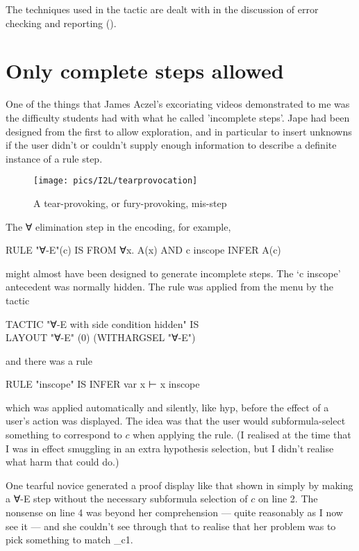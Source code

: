 The techniques used in the tactic are dealt with in the discussion of error checking and reporting ().

\section{Only complete steps allowed}

One of the things that James Aczel's excoriating videos demonstrated to me was the difficulty students had with what he called 'incomplete steps'. Jape had been designed from the first to allow exploration, and in particular to insert unknowns if the user didn't or couldn't supply enough information to describe a definite instance of a rule step. 

\begin{figure}
\centering
\texttt{[image: pics/I2L/tearprovocation]}
\caption{A tear-provoking, or fury-provoking, mis-step}
\label{fig:I2L:tearprovocation}
\end{figure}

The ∀ elimination step in the   encoding, for example,
\begin{japeish}
RULE "∀-E"(c) IS FROM ∀x. A(x) AND c inscope INFER A(c)
\end{japeish}
might almost have been designed to generate incomplete steps. The `c inscope' antecedent was normally hidden. The rule was applied from the menu by the tactic
\begin{japeish}
TACTIC "∀-E with side condition hidden" IS \\
\tab LAYOUT "∀-E" (0) (WITHARGSEL "∀-E")
\end{japeish}
and there was a rule
\begin{japeish}
RULE "inscope" IS INFER var x ⊢ x inscope
\end{japeish}
which was applied automatically and silently, like hyp, before the effect of a user's action was displayed. The idea was that the user would subformula-select something to correspond to $c$ when applying the rule. (I realised at the time that I was in effect smuggling in an extra hypothesis selection, but I didn't realise what harm that could do.)

One tearful novice generated a proof display like that shown in  simply by making a ∀-E step without the necessary subformula selection of $c$ on line 2. The nonsense on line 4 was beyond her comprehension --- quite reasonably as I now see it --- and she couldn't see through that to realise that her problem was to pick something to match \_c1.

